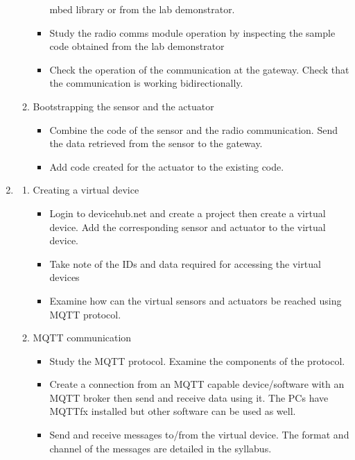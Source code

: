 \documentclass[a4paper]{article}
\begin{document}
\begin{enumerate}
\begin{enumerate}
\begin{itemize}
            mbed library or from the lab demonstrator.
            \item Study the radio comms module operation by inspecting the sample code obtained from the
            lab demonstrator
            \item Check the operation of the communication at the gateway. Check that the communication is
            working bidirectionally.
        \end{itemize}
        \item Bootstrapping the sensor and the actuator
        \begin{itemize}
            \item Combine the code of the sensor and the radio communication. Send the data retrieved 
            from the sensor to the gateway.
            \item Add code created for the actuator to the existing code.
        \end{itemize}
    \end{enumerate}
    \item \begin{enumerate}
        \item Creating a virtual device
        \begin{itemize}
            \item Login to devicehub.net and create a project then create a virtual device. 
            Add the corresponding sensor and actuator to the virtual device.
            \item Take note of the IDs and data required for accessing the virtual devices
            \item Examine how can the virtual sensors and actuators be reached using MQTT protocol.
        \end{itemize}
        \item MQTT communication
        \begin{itemize}
            \item Study the MQTT protocol. Examine the components of the protocol.
            \item Create a connection from an MQTT capable device/software with an MQTT broker then
            send and receive data using it. The PCs have MQTTfx installed but other software can
            be used as well.
            \item Send and receive messages to/from the virtual device. The format and channel of
            the messages are detailed in the syllabus.
        \end{itemize}

\end{enumerate}
\end{enumerate}
\end{document}
